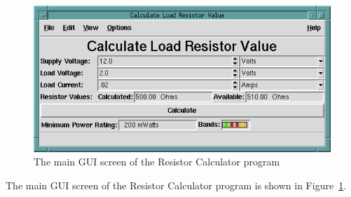 \begin{figure}[hbpt]
\begin{centering}
\includegraphics[width=5in]{RestMain.png}
\caption{The main GUI screen of the Resistor Calculator program}
\label{fig:rest:Main}
\end{centering}
\end{figure}
The main GUI screen of the Resistor Calculator program is shown in
Figure~\ref{fig:rest:Main}.  

